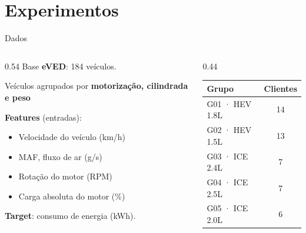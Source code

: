\documentclass[aspectratio=169,11pt]{beamer}
\begin{document}
\section{Experimentos}

\begin{frame}{Dados}
  \begin{columns}[T]
    \begin{column}{0.54\textwidth}
      Base \textbf{eVED}: 184 veículos.
      \medskip

      Veículos agrupados por \textbf{motorização, cilindrada e peso}
      \medskip

      \textbf{Features} (entradas):
      \begin{itemize}
        \item Velocidade do veículo (km/h)
        \item MAF, fluxo de ar (g/s)
        \item Rotação do motor (RPM)
        \item Carga absoluta do motor (\%)
      \end{itemize}
      \textbf{Target}: consumo de energia (kWh).
    \end{column}
    \begin{column}{0.44\textwidth}
      \centering \small
      \begin{tabular}{lc}
        \toprule
        Grupo & Clientes \\
        \midrule
        G01 · HEV 1.8L   & 14 \\
        G02 · HEV 1.5L   & 13 \\
        G03 · ICE 2.4L   & 7  \\
        G04 · ICE 2.5L   & 7  \\
        G05 · ICE 2.0L   & 6  \\
        \bottomrule
      \end{tabular}
    \end{column}
  \end{columns}
\end{frame}
\end{document}
